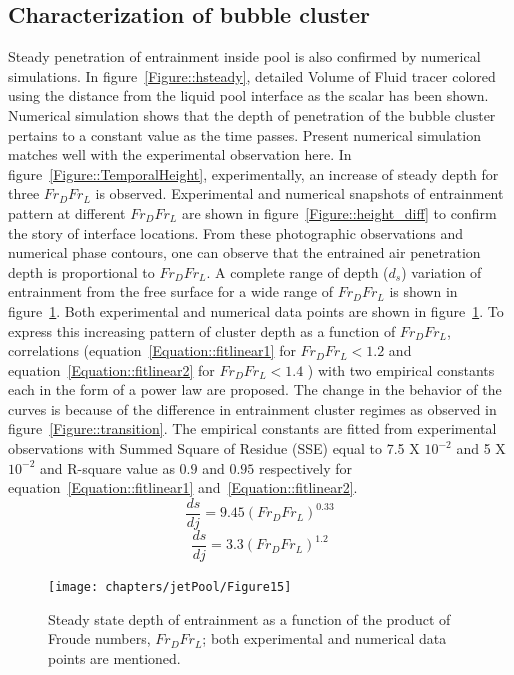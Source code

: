 \subsection{Characterization of bubble cluster}
Steady penetration of entrainment inside pool is also confirmed by numerical simulations. In figure~\ref{Figure::hsteady}, detailed Volume of Fluid tracer colored using the distance from the liquid pool interface as the scalar has been shown. Numerical simulation shows that the depth of penetration of the bubble cluster pertains to a constant value as the time passes. Present numerical simulation matches well with the experimental observation here. In figure~\ref{Figure::TemporalHeight}, experimentally, an increase of steady depth for three $Fr_DFr_L$ is observed. Experimental and numerical snapshots of entrainment pattern at different $Fr_DFr_L$ are shown in figure~\ref{Figure::height_diff} to confirm the story of interface locations. From these photographic observations and numerical phase contours, one can observe that the entrained air penetration depth is proportional to $Fr_DFr_L$. A complete range of depth ($d_s$) variation of entrainment from the free surface for a wide range of $Fr_DFr_L$ is shown in  figure~\ref{Figure::hFr}. Both experimental and numerical data points are shown in figure~\ref{Figure::hFr}. To express this increasing pattern of cluster depth as a function of $Fr_DFr_L$, correlations (equation~\ref{Equation::fitlinear1} for $Fr_DFr_L < 1.2$ and equation~\ref{Equation::fitlinear2} for $Fr_DFr_L < 1.4$ ) with two empirical constants each in the form of a power law are proposed. The change in the behavior of the curves is because of the difference in entrainment cluster regimes as observed in figure~\ref{Figure::transition}. The empirical constants are fitted from experimental observations with Summed Square of Residue (SSE) equal to 7.5 X $10^{-2}$ and 5 X $10^{-2}$ and R-square value as $0.9$ and $0.95$ respectively for equation~\ref{Equation::fitlinear1} and~\ref{Equation::fitlinear2}. 
\begin{equation}
\frac{ds}{dj} = 9.45(Fr_DFr_L)^{0.33}
\label{Equation::fitlinear1}
\end{equation}%
\begin{equation}
\frac{ds}{dj} = 3.3(Fr_DFr_L)^{1.2}
\label{Equation::fitlinear2}
\end{equation}%
\begin{figure}
	\centering
	\texttt{[image: chapters/jetPool/Figure15]}
	\caption{Steady state depth of entrainment as a function of the product of Froude numbers, $Fr_DFr_L$; both experimental and numerical data points are mentioned.}
	\label{Figure::hFr}
\end{figure}

